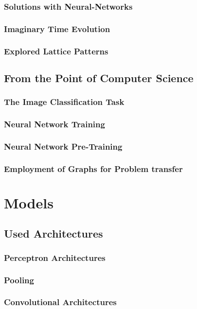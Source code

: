 \documentclass[
headings=optiontohead,              %
12pt,                               %
DIV=13,                             %
twoside=false,                      %
open=right,                         %
BCOR=10mm,                          %
toc=bibliographynumbered            %
]{scrreport}
\begin{document}
        \subsection{Solutions with Neural-Networks}
        \subsection{Imaginary Time Evolution}
        \subsection{Explored Lattice Patterns}
    \section{From the Point of Computer Science}
        \subsection{The Image Classification Task}
        \subsection{Neural Network Training}
        \subsection{Neural Network Pre-Training}
        \subsection{Employment of Graphs for Problem transfer}

\chapter{Models}
    \section{Used Architectures}
        \subsection{Perceptron Architectures}
        \subsection{Pooling}
        \subsection{Convolutional Architectures}
\end{document}
